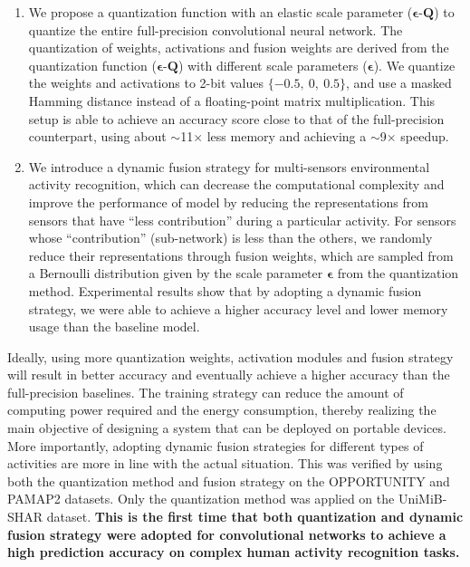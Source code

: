 \documentclass[twoside,twocolumn]{article}
\begin{document}
\begin{enumerate}
\item We propose a quantization function with an elastic scale parameter ($\boldsymbol{\epsilon}$-$\boldsymbol{Q}$) to quantize the entire full-precision convolutional neural network. The quantization of weights, activations and fusion weights are derived from the quantization function ($\boldsymbol{\epsilon }$-$\boldsymbol{Q}$) with different scale parameters ($\boldsymbol{\epsilon }$). We quantize the weights and activations to 2-bit values ${\{-0.5,\ 0,\ 0.5\}}$, and use a masked Hamming distance instead of a floating-point matrix multiplication. This setup is able to achieve an accuracy score close to that of the full-precision counterpart, using about $\sim$11$\times$ less memory and achieving a $\sim$9$\times$ speedup.

\item We introduce a dynamic fusion strategy for multi-sensors environmental activity recognition, which can decrease the computational complexity and improve the performance of model by reducing the representations from sensors that have ``less contribution'' during a particular activity. For sensors whose ``contribution'' (sub-network) is less than the others, we randomly reduce their representations through fusion weights, which are sampled from a Bernoulli distribution given by the scale parameter $\boldsymbol{\epsilon}$ from the quantization method. Experimental results show that by adopting a dynamic fusion strategy, we were able to achieve a higher accuracy level and lower memory usage than the baseline model.
\end{enumerate}

Ideally, using more quantization weights, activation modules and fusion strategy will result in better accuracy and eventually achieve a higher accuracy than the full-precision baselines. The training strategy can reduce the amount of computing power required and the energy consumption, thereby realizing the main objective of designing a system that can be deployed on portable devices. More importantly, adopting dynamic fusion strategies for different types of activities are more in line with the actual situation. This was verified by using both the quantization method and fusion strategy on the OPPORTUNITY and PAMAP2 datasets. Only the quantization method was applied on the UniMiB-SHAR dataset. \textbf{This is the first time that both quantization and dynamic fusion strategy were adopted for convolutional networks to achieve a high prediction accuracy on complex human activity recognition tasks.}
\end{document}
